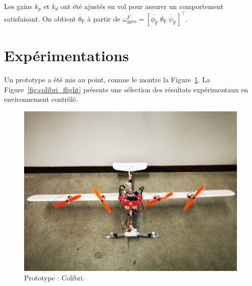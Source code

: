 Les gains $k_{p}$ et $k_{d}$ ont été ajustés en vol pour assurer un comportement satisfaisant. On obtient $\dot{\theta_{\text{F}}}$ à partir de $\omega_{gyro}^{F} = [\dot{\phi_{\text{F}}}~\dot{\theta_{\text{F}}}~\dot{\psi_{\text{F}}}]^\top$.

\section{Expérimentations}
\label{sec:exp}
Un prototype a été mis au point, comme le montre la Figure~\ref{fig:colibri_real}. La Figure~\ref{fig:colibri_flight} présente une sélection des résultats expérimentaux en environnement contrôlé.


\begin{figure}[ht!]
    \centering
    \includegraphics[trim={0 15cm 0 25cm},clip, width=0.6\columnwidth]{figures/colibri_real.jpg}
    \caption{Prototype : Colibri.}
    \label{fig:colibri_real}
\end{figure}

